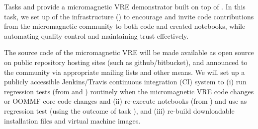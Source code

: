 \begin{workpackage}
\begin{tasklist}
\begin{task}[id=dissemination-of-oommf-nb-virtual-environment,
  title=Open source dissemination of micromagnetic VRE,
  lead=USO,PM=4]
  Tasks  and 
   provide a micromagnetic
  VRE demonstrator built on top of \TheProject. 
  In this task, we set up of the infrastructure () to encourage and
  invite code contributions from the micromagnetic community to both
  code and created notebooks, while
  automating quality control and maintaining trust effectively. 

  The source code of the micromagnetic VRE will be made available as open source
  on public repository hosting sites (such as github/bitbucket), and
  announced to the community via appropriate mailing lists and other means. We will set up a
  publicly accessible Jenkins/Travis continuous integration (CI)
  system to (i) run regression tests (from
   and
  ) routinely when the
  micromagnetic VRE code changes or OOMMF core code changes and (ii)
  re-execute notebooks (from
  ) and use as
  regression test (using the outcome of task
  ), and (iii) re-build
  downloadable installation files and virtual machine images. 


\end{task}

\begin{task}[title=Micromagnetic VRE dissemination workshops,
id=dissemination-of-oommf-nb-workshops,lead=USO,PM=6]



\end{task}
\end{tasklist}
\end{workpackage}
